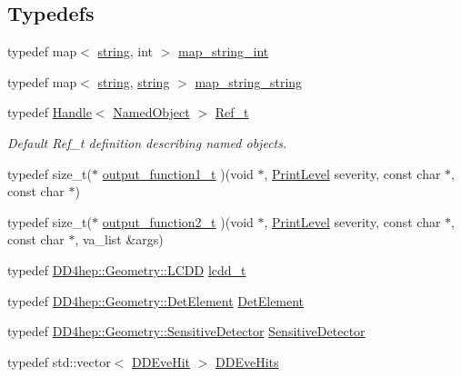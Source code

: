\subsection*{Typedefs}
\begin{DoxyCompactItemize}
\item 
typedef map$<$ \hyperlink{classstd_1_1string}{string}, int $>$ \hyperlink{namespace_d_d4hep_a5d68f9c863a419d5ed00cc08b473e352}{map\_\-string\_\-int}
\item 
typedef map$<$ \hyperlink{classstd_1_1string}{string}, \hyperlink{classstd_1_1string}{string} $>$ \hyperlink{namespace_d_d4hep_a0f6ae5793bad82d7e3c5a6fd76334cf1}{map\_\-string\_\-string}
\item 
typedef \hyperlink{class_d_d4hep_1_1_handle}{Handle}$<$ \hyperlink{class_d_d4hep_1_1_named_object}{NamedObject} $>$ \hyperlink{group___d_d4_h_e_p___g_e_o_m_e_t_r_y_ga40af83be6718bb8828a3d83dc7f8c930}{Ref\_\-t}
\begin{DoxyCompactList}\small\item\em Default Ref\_\-t definition describing named objects. \item\end{DoxyCompactList}\item 
typedef size\_\-t($\ast$ \hyperlink{namespace_d_d4hep_ae75e3a861e057274d7f7bb67011ff3b4}{output\_\-function1\_\-t} )(void $\ast$, \hyperlink{namespace_d_d4hep_a5b5a64d56252469451f2020a27d57d42}{PrintLevel} severity, const char $\ast$, const char $\ast$)
\item 
typedef size\_\-t($\ast$ \hyperlink{namespace_d_d4hep_a782306f3df224bf6e5be62c498715cd1}{output\_\-function2\_\-t} )(void $\ast$, \hyperlink{namespace_d_d4hep_a5b5a64d56252469451f2020a27d57d42}{PrintLevel} severity, const char $\ast$, const char $\ast$, va\_\-list \&args)
\item 
typedef \hyperlink{class_d_d4hep_1_1_geometry_1_1_l_c_d_d}{DD4hep::Geometry::LCDD} \hyperlink{namespace_d_d4hep_a9d7154801ec259f2a1d2fe015d140518}{lcdd\_\-t}
\item 
typedef \hyperlink{class_d_d4hep_1_1_geometry_1_1_det_element}{DD4hep::Geometry::DetElement} \hyperlink{namespace_d_d4hep_a21dd977310ff183f61ca6ae14b59a989}{DetElement}
\item 
typedef \hyperlink{class_d_d4hep_1_1_geometry_1_1_sensitive_detector}{DD4hep::Geometry::SensitiveDetector} \hyperlink{namespace_d_d4hep_ae77e9f3818be8d649b030c537e235efe}{SensitiveDetector}
\item 
typedef std::vector$<$ \hyperlink{class_d_d4hep_1_1_d_d_eve_hit}{DDEveHit} $>$ \hyperlink{namespace_d_d4hep_a5e3dc9e6071a76b39c0274507645600c}{DDEveHits}

\end{DoxyCompactItemize}
